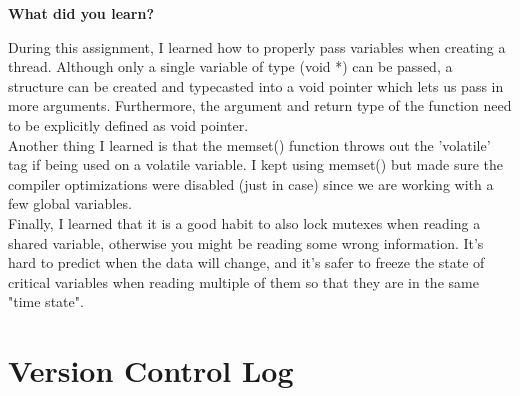 \documentclass[10pt,letterpaper,draftclsnofoot,onecolumn]{IEEEtran}
\begin{document}
\bigskip

\noindent\textbf{What did you learn?}
\medskip

\noindent During this assignment, I learned how to properly pass variables when creating a thread. Although only a single variable of type (void *) can be passed, a structure can be created and typecasted into a void pointer which lets us pass in more arguments.  Furthermore, the argument and return type of the function need to be explicitly defined as void pointer.\\
\noindent Another thing I learned is that the memset() function throws out the 'volatile' tag if being used on a volatile variable. I kept using memset() but made sure the compiler optimizations were disabled (just in case) since we are working with a few global variables.\\
\noindent Finally, I learned that it is a good habit to also lock mutexes when reading a shared variable, otherwise you might be reading some wrong information. It’s hard to predict when the data will change, and it’s safer to freeze the state of critical variables when reading multiple of them so that they are in the same "time state".\\
\bigskip

\section{Version Control Log}
\bigskip
\end{document}
